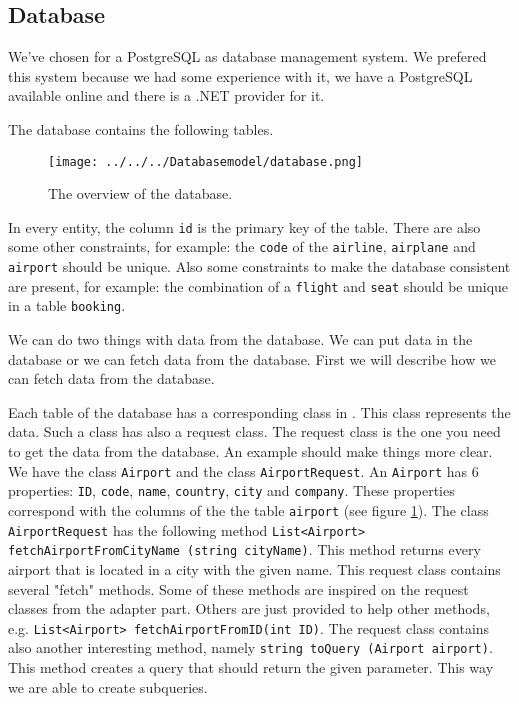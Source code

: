
\subsection{Database}
We've chosen for a PostgreSQL as database management system. We prefered this system because we had some experience with it, we have a PostgreSQL available online and there is a .NET provider for it.

The database contains the following tables.
\begin{figure}[H]
	\centering
	\texttt{[image: ../../../Databasemodel/database.png]}
	\caption{The overview of the database.}
	\label{fig:database_design}
\end{figure}
In every entity, the column \texttt{id} is the primary key of the table. There are also some other constraints, for example: the \texttt{code} of the \texttt{airline}, \texttt{airplane} and \texttt{airport} should be unique. Also some constraints to make the database consistent are present, for example: the combination of a \texttt{flight} and \texttt{seat} should be unique in a table \texttt{booking}. 

We can do two things with data from the database. We can put data in the database or we can fetch data from the database. First we will describe how we can fetch data from the database.

Each table of the database has a corresponding class in \Csh. This class represents the  data. Such a class has also a request class. The request class is the one you need to get the data from the database. An example should make things more clear. We have the class \texttt{Airport} and the class \texttt{AirportRequest}. An \texttt{Airport} has 6 properties: \texttt{ID}, \texttt{code}, \texttt{name}, \texttt{country}, \texttt{city} and  \texttt{company}. These properties correspond with the columns of the the table \texttt{airport} (see figure \ref{fig:database_design}). The class \texttt{AirportRequest} has the following method \texttt{List<Airport> fetchAirportFromCityName (string cityName)}. This method returns every airport that is located in a city with the given name. This request class contains several "fetch" methods. Some of these methods are inspired on the request classes from the adapter part. Others are just provided to help other methods, e.g. \texttt{List<Airport> fetchAirportFromID(int ID)}. The request class contains also another interesting method, namely \texttt{string toQuery (Airport airport)}. This method creates a query that should return the given parameter. This way we are able to create subqueries.

